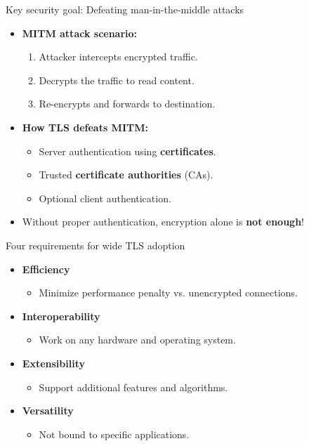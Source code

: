 \documentclass[aspectratio=169, lualatex, handout]{beamer}
\begin{document}
\begin{frame}{Key security goal: Defeating man-in-the-middle attacks}
	\begin{itemize}
		\item \textbf{MITM attack scenario:}
		      \begin{enumerate}
			      \item Attacker intercepts encrypted traffic.
			      \item Decrypts the traffic to read content.
			      \item Re-encrypts and forwards to destination.
		      \end{enumerate}
		\item \textbf{How TLS defeats MITM:}
		      \begin{itemize}
			      \item Server authentication using \textbf{certificates}.
			      \item Trusted \textbf{certificate authorities} (CAs).
			      \item Optional client authentication.
		      \end{itemize}
		\item Without proper authentication, encryption alone is \textbf{not enough}!
	\end{itemize}
\end{frame}

\begin{frame}{Four requirements for wide TLS adoption}
	\begin{itemize}
		\item \textbf{Efficiency}
		      \begin{itemize}
			      \item Minimize performance penalty vs. unencrypted connections.
		      \end{itemize}
		\item \textbf{Interoperability}
		      \begin{itemize}
			      \item Work on any hardware and operating system.
		      \end{itemize}
		\item \textbf{Extensibility}
		      \begin{itemize}
			      \item Support additional features and algorithms.
		      \end{itemize}
		\item \textbf{Versatility}
		      \begin{itemize}
			      \item Not bound to specific applications.
		      \end{itemize}
	\end{itemize}
\end{frame}
\end{document}
